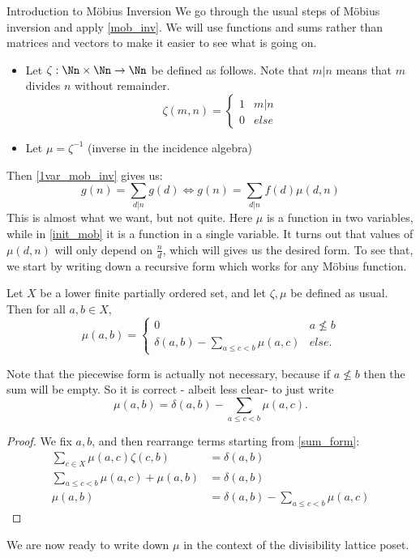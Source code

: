 \documentclass[12pt]{pom_thesis}
\begin{document}
\begin{chapter}{Introduction to M\"obius Inversion}
We go through the usual steps of M\"obius inversion and apply \ref{mob_inv}. We will use functions and sums rather than matrices and vectors to make it easier to see what is going on.
\begin{itemize}
\item Let $\zeta: \Nn \times \Nn \rightarrow \Nn$ be defined as follows. Note that $m|n$ means that $m$ divides $n$ without remainder.
\[
\zeta(m,n) = \begin{cases}1 & m|n \\ 0 & else \end{cases}
\]
\item Let $\mu = \zeta^{-1}$ (inverse in the incidence algebra)
\end{itemize}
Then \ref{1var_mob_inv} gives us:
\[
g(n) = \sum_{d | n} g(d) \iff g(n) = \sum_{d | n}  f(d)\mu(d,n)
\]
This is almost what we want, but not quite. Here $\mu$ is a function in two variables, while in \ref{init_mob} it is a function in a single variable. It turns out that values of $\mu(d,n)$ will only depend on $\frac nd$, which will gives us the desired form. To see that, we start by writing down a recursive form which works for any M\"obius function.

\begin{lemma}\label{recurse}
Let $X$ be a lower finite partially ordered set, and let $\zeta, \mu$ be defined as usual. Then for all $a, b \in X$,
\[
\mu(a,b) = 
\begin{cases}
0 & a \nleq b\\
\delta(a,b)-\sum_{a \leq c < b}\mu(a,c) & else.
\end{cases}
\]
\end{lemma}
\begin{rmk}
Note that the piecewise form is actually not necessary, because if $a \nleq b$ then the sum will be empty. So it is correct - albeit less clear- to just write
\[
\mu(a,b) = \delta(a,b)-\sum_{a \leq c < b}\mu(a,c).
\]
\end{rmk}
\begin{proof}
We fix $a,b$, and then rearrange terms starting from \ref{sum_form}:
\begin{align*}
\sum_{c \in X}\mu(a,c) \zeta(c,b) &= \delta(a,b)\\
\sum_{a \leq c < b} \mu(a,c) + \mu(a,b) &= \delta(a,b)\\
\mu(a,b) &= \delta(a,b) - \sum_{a \leq c < b} \mu(a,c) 
\end{align*}
\end{proof}
We are now ready to write down $\mu$ in the context of the divisibility lattice poset. 


\end{chapter}
\end{document}
